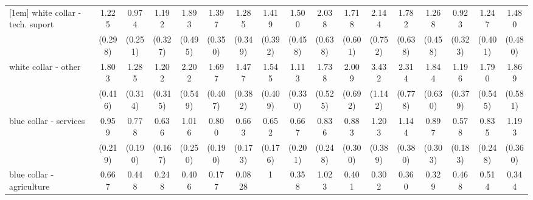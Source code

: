 {\begin{tabular}{l*{16}{c}}
[1em]
white collar - tech. suport&       1.225         &       0.974         &       1.192         &       1.893\sym{*}  &       1.397         &       1.285         &       1.419         &       1.500         &       2.038\sym{*}  &       1.718         &       2.144\sym{*}  &       1.782         &       1.268         &       0.923         &       1.247         &       1.480         \\
                    &     (0.298)         &     (0.251)         &     (0.327)         &     (0.495)         &     (0.350)         &     (0.349)         &     (0.392)         &     (0.458)         &     (0.638)         &     (0.601)         &     (0.752)         &     (0.638)         &     (0.458)         &     (0.323)         &     (0.401)         &     (0.480)         \\
[1em]
white collar - other&       1.803\sym{*}  &       1.285         &       1.202         &       2.202\sym{**} &       1.697\sym{*}  &       1.477         &       1.545         &       1.113         &       1.738         &       2.009\sym{*}  &       3.432\sym{***}&       2.314\sym{*}  &       1.844         &       1.196         &       1.790         &       1.869\sym{*}  \\
                    &     (0.416)         &     (0.314)         &     (0.315)         &     (0.549)         &     (0.407)         &     (0.382)         &     (0.409)         &     (0.330)         &     (0.525)         &     (0.692)         &     (1.142)         &     (0.778)         &     (0.630)         &     (0.379)         &     (0.545)         &     (0.581)         \\
[1em]
blue collar - services&       0.959         &       0.778         &       0.636         &       1.016         &       0.800         &       0.663         &       0.652         &       0.667         &       0.836         &       0.883         &       1.203         &       1.144         &       0.897         &       0.578         &       0.835         &       1.193         \\
                    &     (0.219)         &     (0.190)         &     (0.167)         &     (0.250)         &     (0.190)         &     (0.173)         &     (0.176)         &     (0.201)         &     (0.248)         &     (0.300)         &     (0.389)         &     (0.380)         &     (0.303)         &     (0.183)         &     (0.248)         &     (0.360)         \\
[1em]
blue collar - agriculture&       0.667         &       0.448         &       0.248\sym{*}  &       0.406         &       0.177\sym{*}  &      0.0828\sym{*}  &           1         &       0.358         &       1.023         &       0.401         &       0.302         &       0.360         &       0.329         &       0.468         &       0.514         &       0.344         \\

\end{tabular}}

